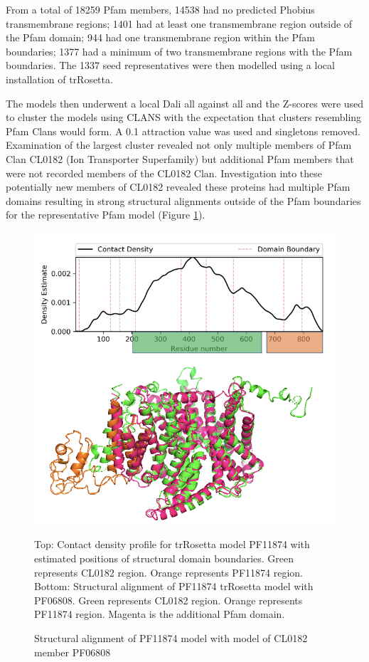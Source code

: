 From a total of 18259 Pfam members, 14538 had no predicted Phobius transmembrane regions; 1401 had at least one transmembrane region outside of the Pfam domain; 944 had one transmembrane region within the Pfam boundaries; 1377 had a minimum of two transmembrane regions with the Pfam boundaries.  The 1337 seed representatives were then modelled using a local installation of trRosetta. 



The models then underwent a local Dali \cite{Holm2016} all against all and the Z-scores were used to cluster the models using CLANS \cite{Frickey2004} with the expectation that clusters resembling Pfam Clans would form. A 0.1 attraction value was used and singletons removed. Examination of the largest cluster revealed not only multiple members of Pfam Clan CL0182 (Ion Transporter Superfamily) but additional Pfam members that were not recorded members of the CL0182 Clan. Investigation into these potentially new members of CL0182 revealed these proteins had multiple Pfam domains resulting in strong structural alignments outside of the Pfam boundaries for the representative Pfam model (Figure \ref{fig:pfam_domain}). 

\begin{figure}[th!]
    \centering
    \includegraphics[width=150mm, scale=0.75]{Pfam/pfam_domains.png}
    \caption{Structural alignment of PF11874 model with model of CL0182 member PF06808}
    \label{fig:pfam_domain}
    \small
    Top: Contact density profile for trRosetta model PF11874  with estimated positions of structural domain boundaries.  Green represents CL0182 region. Orange represents PF11874 region. 
    Bottom: Structural alignment of PF11874 trRosetta model with PF06808.  Green represents CL0182 region. Orange represents PF11874 region.  Magenta is the additional Pfam domain.
\end{figure}

